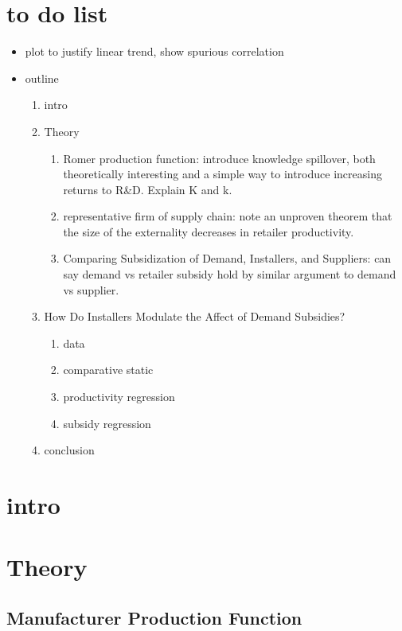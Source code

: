 \documentclass{article}
\begin{document}
\section*{to do list}

\begin{itemize}
	\item plot to justify linear trend, show spurious correlation
	\item outline
	\begin{enumerate}
		\item intro
		\item Theory
		\begin{enumerate}
			\item Romer production function: introduce knowledge spillover, both theoretically interesting and a simple way to introduce increasing returns to R\&D. Explain K and k.
			\item representative firm of supply chain: note an unproven theorem that the size of the externality decreases in retailer productivity.
			\item Comparing Subsidization of Demand, Installers, and Suppliers: can say demand vs retailer subsidy hold by similar argument to demand vs supplier.
		\end{enumerate}
		\item How Do Installers Modulate the Affect of Demand Subsidies?
		\begin{enumerate}
			\item data
			\item comparative static
			\item productivity regression
			\item subsidy regression
			\end{enumerate}
		\item conclusion
	\end{enumerate}
\end{itemize}

\section{intro}

\section{Theory}

\subsection{Manufacturer Production Function}
\end{document}
